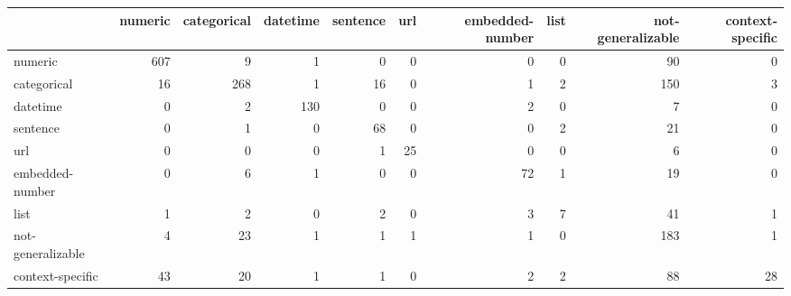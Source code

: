 \begin{tabular}{lrrrrrrrrr}
\toprule
{} &  numeric &  categorical &  datetime &  sentence &  url &  embedded-number &  list &  not-generalizable &  context-specific \\
\midrule
numeric           &      607 &            9 &         1 &         0 &    0 &                0 &     0 &                 90 &                 0 \\
categorical       &       16 &          268 &         1 &        16 &    0 &                1 &     2 &                150 &                 3 \\
datetime          &        0 &            2 &       130 &         0 &    0 &                2 &     0 &                  7 &                 0 \\
sentence          &        0 &            1 &         0 &        68 &    0 &                0 &     2 &                 21 &                 0 \\
url               &        0 &            0 &         0 &         1 &   25 &                0 &     0 &                  6 &                 0 \\
embedded-number   &        0 &            6 &         1 &         0 &    0 &               72 &     1 &                 19 &                 0 \\
list              &        1 &            2 &         0 &         2 &    0 &                3 &     7 &                 41 &                 1 \\
not-generalizable &        4 &           23 &         1 &         1 &    1 &                1 &     0 &                183 &                 1 \\
context-specific  &       43 &           20 &         1 &         1 &    0 &                2 &     2 &                 88 &                28 \\
\bottomrule
\end{tabular}
